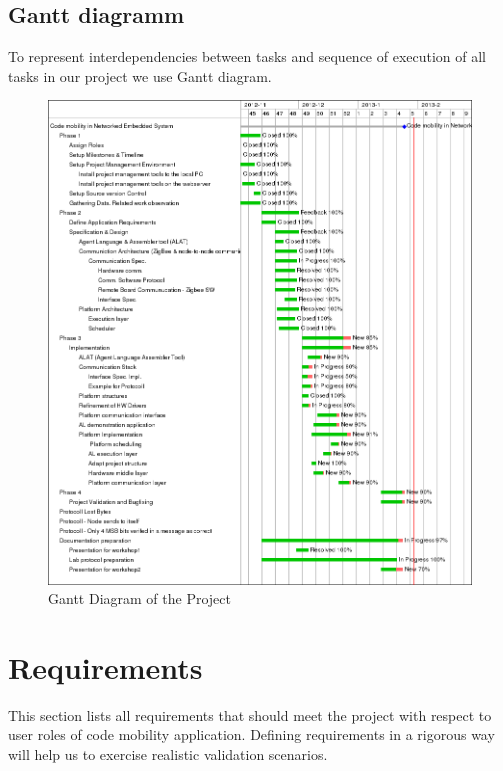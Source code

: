 \documentclass{scrreprt}
\begin{document}
	\section{Gantt diagramm}

To represent interdependencies between tasks and sequence of execution of all tasks in our project we use Gantt diagram.

\begin{figure}[!htbp]
\centering
\includegraphics[scale=0.4]{figures/gantt.png}
\caption{Gantt Diagram of the Project}
\label{fig:ganttdiag}
\end{figure}


\chapter{Requirements}

This section lists all requirements that should meet the project with respect to 
user roles of code mobility application.
Defining requirements in a rigorous way will help us to exercise realistic validation scenarios.


\renewcommand{\labelenumi}{R_\arabic{enumi}}
\renewcommand{\labelenumii}{R_\arabic{enumi}_\arabic{enumii}}
\end{document}
